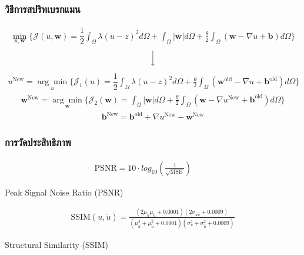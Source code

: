 \documentclass[xcolor=dvipsnames, xetex,serif]{beamer}
\numberwithin{equation}{section}
\begin{document}
	\begin{frame}
		\frametitle{วิธีการสปริทเบรกแมน}
			\begin{align*}
		\min_{u,\boldsymbol{w}} \{ \mathcal{J}(u,\boldsymbol{w}) = \dfrac{1}{2} \int_{\Omega} \lambda(u-z)^2 d\Omega +  \int_{\Omega}  |\boldsymbol{w}|  d\Omega + \frac{\theta}{2} \int_{\Omega} (\boldsymbol{w} - \nabla u + \boldsymbol{b}) d\Omega \}
		\end{align*}
		$$ \Big \downarrow$$
		\begin{align*}
		u^{\text{New}}=\underset{u}{\arg\min} \{ \mathcal{J}_1(u) = \dfrac{1}{2} \int_{\Omega} \lambda(u-z)^2 d\Omega + \frac{\theta}{2} \int_{\Omega} (\boldsymbol{w}^{\text{old}} - \nabla u + \boldsymbol{b}^{\text{old}}) d\Omega \}
		\end{align*}
		\begin{align*}
		\boldsymbol{w}^{\text{New}}=\underset{\boldsymbol{w}}{\arg\min} \{ \mathcal{J}_2(\boldsymbol{w}) = \int_{\Omega}  | \boldsymbol{w}|  d\Omega  + \frac{\theta}{2} \int_{\Omega} (\boldsymbol{w} - \nabla u^{\text{New}} + \boldsymbol{b}^{\text{old}}) d\Omega \}
		\end{align*}
		\begin{align*}
		\boldsymbol{b}^{\text{New}}=\boldsymbol{b}^{\text{old}}+\nabla u^{\text{New}}-\boldsymbol{w}^{\text{New}}
		\end{align*}
	\end{frame}  
	\begin{frame}
		\frametitle{การวัดประสิทธิภาพ}
		\begin{align*}
			\text{PSNR}  = 10 \cdot log_{10} ( \frac{1}{\sqrt{\text{MSE}}} )  \hspace{1cm}
		\end{align*}
		\begin{center}
			Peak Signal Noise Ratio \textcolor{PineGreen}{(PSNR)} 
		\end{center}
		\vspace{1cm}
		\begin{align*}
			\text{SSIM}(u,\tilde{u}) = \frac{(2\mu_u\mu_{\tilde{u}} + 0.0001)(2\sigma_{u\tilde{u}} + 0.0009)}{(\mu_u^2+\mu_{\tilde{u}}^2+0.0001)(\sigma_u^2+\sigma_{\tilde{u}}^2+0.0009)}
		\end{align*}
		\begin{center}
			Structural Similarity \textcolor{PineGreen}{(SSIM)}
		\end{center}
	\end{frame}
\end{document}
